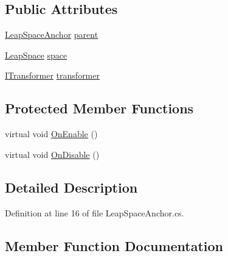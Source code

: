 \subsection*{Public Attributes}
\begin{DoxyCompactItemize}
\item 
\mbox{\hyperlink{class_leap_1_1_unity_1_1_space_1_1_leap_space_anchor}{Leap\+Space\+Anchor}} \mbox{\hyperlink{class_leap_1_1_unity_1_1_space_1_1_leap_space_anchor_a8df76f5c9ba6a0f169880fec6bca557b}{parent}}
\item 
\mbox{\hyperlink{class_leap_1_1_unity_1_1_space_1_1_leap_space}{Leap\+Space}} \mbox{\hyperlink{class_leap_1_1_unity_1_1_space_1_1_leap_space_anchor_a77daae8f1a9f57ef4dc3e75fe5801bcd}{space}}
\item 
\mbox{\hyperlink{interface_leap_1_1_unity_1_1_space_1_1_i_transformer}{I\+Transformer}} \mbox{\hyperlink{class_leap_1_1_unity_1_1_space_1_1_leap_space_anchor_a6f98d35d75f83e2ff2c978715520c836}{transformer}}
\end{DoxyCompactItemize}
\subsection*{Protected Member Functions}
\begin{DoxyCompactItemize}
\item 
virtual void \mbox{\hyperlink{class_leap_1_1_unity_1_1_space_1_1_leap_space_anchor_abc81e1e200c6c14e6dab295309b7c854}{On\+Enable}} ()
\item 
virtual void \mbox{\hyperlink{class_leap_1_1_unity_1_1_space_1_1_leap_space_anchor_a32bd2bf4b3fd30ee608f1e6b2d07af88}{On\+Disable}} ()
\end{DoxyCompactItemize}


\subsection{Detailed Description}


Definition at line 16 of file Leap\+Space\+Anchor.\+cs.



\subsection{Member Function Documentation}
\mbox{\label{class_leap_1_1_unity_1_1_space_1_1_leap_space_anchor_a46df24f040b141165265e8bef97fb1d5}} 
